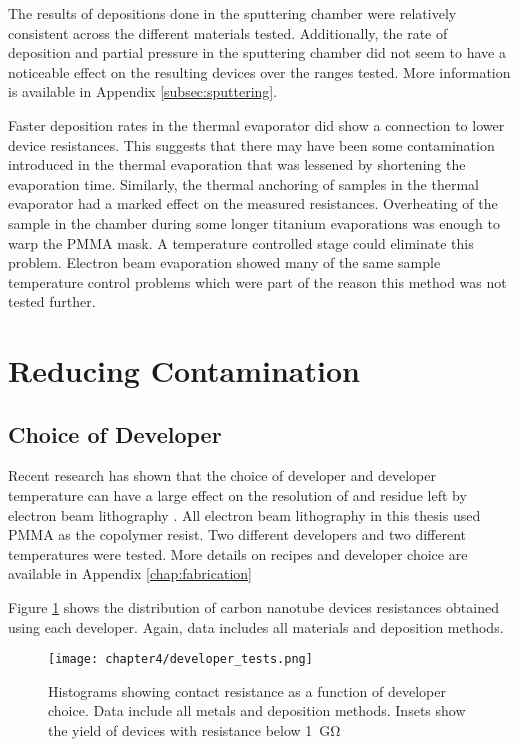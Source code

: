 The results of depositions done in the sputtering chamber were relatively consistent across the different materials tested. Additionally, the rate of deposition and partial pressure in the sputtering chamber did not seem to have a noticeable effect on the resulting devices over the ranges tested. More information is available in Appendix \ref{subsec:sputtering}. 

Faster deposition rates in the thermal evaporator did show a connection to lower device resistances. This suggests that there may have been some contamination introduced in the thermal evaporation that was lessened by shortening the evaporation time. Similarly, the thermal anchoring of samples in the thermal evaporator had a marked effect on the measured resistances. Overheating of the sample in the chamber during some longer titanium evaporations was enough to warp the PMMA mask. A temperature controlled stage could eliminate this problem. Electron beam evaporation showed many of the same sample temperature control problems which were part of the reason this method was not tested further.

\section{Reducing Contamination}

\subsection{Choice of Developer}
\label{subsec:developer_choice}

Recent research has shown that the choice of developer and developer temperature can have a large effect on the resolution of and residue left by electron beam lithography \cite{Maximov2009, Macintyre2009, Aurich2012}. All electron beam lithography in this thesis used PMMA as the copolymer resist. Two different developers and two different temperatures were tested. More details on recipes and developer choice are available in Appendix \ref{chap:fabrication}

Figure \ref{fig:developer_tests} shows the distribution of carbon nanotube devices resistances obtained using each developer. Again, data includes all materials and deposition methods.

\begin{figure}
    \centering
    \texttt{[image: chapter4/developer\_tests.png]}
    \caption{Histograms showing contact resistance as a function of developer choice. Data include all metals and deposition methods. Insets show the yield of devices with resistance below \SI{1}{\giga\ohm}}
    \label{fig:developer_tests}
\end{figure}

